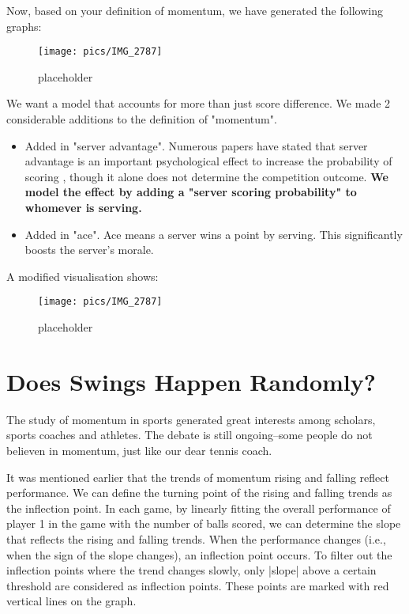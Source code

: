 \documentclass[11pt,a4paper]{article}
\begin{document}
	Now, based on your definition of momentum, we have generated the following graphs:
	
	
	\begin{figure}[H]
		\centering
		\texttt{[image: pics/IMG\_2787]}
		\caption{placeholder}
		\label{fig:img2787}
	\end{figure}	
	
	We want a model that accounts for more than just score difference. We made 2 considerable additions to the definition of "momentum". 
	\begin{itemize}
		\item Added in "server advantage". Numerous papers have stated that server advantage is an important psychological effect to increase the probability of scoring\cite{Klaassen_1999} \cite{MacPhee_Pollard_2004}, though it alone does not determine the competition outcome. \textbf{We model the effect by adding a "server scoring probability" to whomever is serving.}
		\item Added in "ace". Ace means a server wins a point by serving. This significantly boosts the server's morale. 
	\end{itemize} 
	A modified visualisation shows:
	
	\begin{figure}[H]
		\centering
		\texttt{[image: pics/IMG\_2787]}
		\caption{placeholder}
		\label{fig:img2787}
	\end{figure}
	
	
	\section{Does Swings Happen Randomly?}
	The study of momentum in sports generated great interests among scholars, sports coaches and athletes. The debate is still ongoing--some people do not believen in momentum\cite{Hale_2021}, just like our dear tennis coach.
	
	It was mentioned earlier that the trends of momentum rising and falling reflect performance. We can define the turning point of the rising and falling trends as the inflection point. In each game, by linearly fitting the overall performance of player 1 in the game with the number of balls scored, we can determine the slope that reflects the rising and falling trends. When the performance changes (i.e., when the sign of the slope changes), an inflection point occurs. To filter out the inflection points where the trend changes slowly, only |slope| above a certain threshold are considered as inflection points. These points are marked with red vertical lines on the graph.
	
\end{document}
